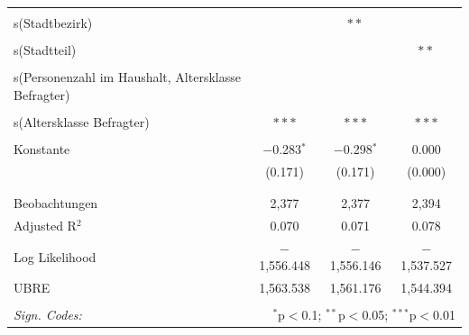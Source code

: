 \documentclass{Vorlage}
\begin{document}
\begin{appendix}
\begin{table}[!htbp]
\begin{tabular}{@{\extracolsep{5pt}}lccc}
  & & & \\ 
 s(Stadtbezirk) &  & $**$ &  \\ 
  & & & \\ 
 s(Stadtteil) &  &  & $**$ \\ 
  & & & \\ 
 s(Personenzahl im Haushalt, Altersklasse Befragter) &  &  &  \\ 
  & & & \\ 
 s(Altersklasse Befragter) & $***$ & $***$ & $***$ \\ 
  & & & \\ 
 Konstante & $-$0.283$^{*}$ & $-$0.298$^{*}$ & 0.000 \\ 
  & (0.171) & (0.171) & (0.000) \\ 
  & & & \\ 
\hline \\[-1.8ex] 
Beobachtungen & 2,377 & 2,377 & 2,394 \\ 
Adjusted R$^{2}$ & 0.070 & 0.071 & 0.078 \\ 
Log Likelihood & $-$1,556.448 & $-$1,556.146 & $-$1,537.527 \\ 
UBRE & 1,563.538 & 1,561.176 & 1,544.394 \\ 
\hline 
\hline \\[-1.8ex] 
\textit{Sign. Codes:}  & \multicolumn{3}{r}{$^{*}$p$<$0.1; $^{**}$p$<$0.05; $^{***}$p$<$0.01} \\ 
\end{tabular} 
\end{table} 



\end{appendix}
\end{document}
